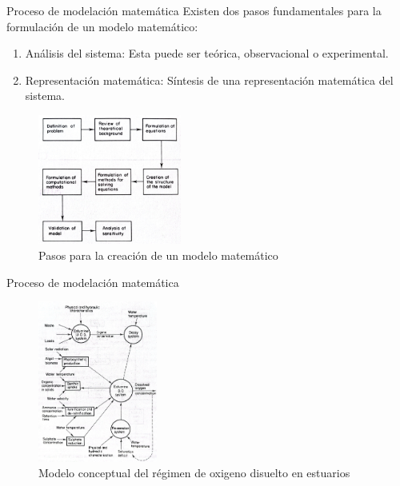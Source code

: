 \documentclass[
10pt,
aspectratio=169,
]{beamer}
\begin{document}
\begin{frame}{Proceso de modelaci\'on matem\'atica}
Existen dos pasos fundamentales para la formulación de un modelo matemático:
\begin{enumerate}
\item \alert{Análisis del sistema}: Esta puede ser teórica, observacional o experimental.
\item \alert{Representaci\'on matem\'atica}: Síntesis de una representaci\'on matem\'atica del sistema.
\end{enumerate}
\vspace{-0.25cm}
\begin{figure}
\centering
\includegraphics[width=0.42\textwidth]{f3mod.jpeg}
\caption{Pasos para la creación de un modelo matemático}
\end{figure}
\end{frame}

\begin{frame}{Proceso de modelaci\'on matem\'atica}
\vspace{-0.2cm}
\begin{figure}
\centering
\includegraphics[width=0.35\textwidth]{f4mod.jpeg}
\caption{Modelo conceptual del régimen de oxigeno disuelto en estuarios}
\end{figure}
\end{frame}



\end{document}
